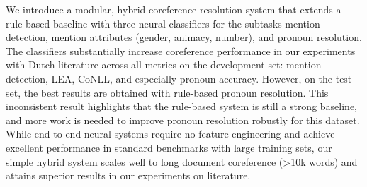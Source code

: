 We introduce a modular, hybrid coreference resolution system that extends a rule-based baseline with three neural classifiers for the subtasks mention detection, mention attributes (gender, animacy, number), and pronoun resolution. The classifiers substantially increase coreference performance in our experiments with Dutch literature across all metrics on the development set: mention detection, LEA, CoNLL, and especially pronoun accuracy. However, on the test set, the best results are obtained with rule-based pronoun resolution. This inconsistent result highlights that the rule-based system is still a strong baseline, and more work is needed to improve pronoun resolution robustly for this dataset. While end-to-end neural systems require no feature engineering and achieve excellent performance in standard benchmarks with large training sets, our simple hybrid system scales well to long document coreference (>10k words) and attains superior results in our experiments on literature.
